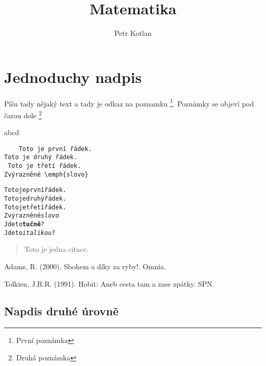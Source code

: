 \documentclass[a4paper, 12pt]{article}
\title{Matematika}
\author{Petr Kotlan}
\date{}
\begin{document}
\maketitle


\section{Jednoduchy nadpis}
Píšu tady nějaký text a tady je odkaz na poznamku \footnote[1]{První poznámka}.
Poznámky \footnotemark[1]{} se objeví pod čarou dole \footnote{Druhá poznámka}

\begin{multicols}{4}
    \tiny
    \lipsum[1-2]
\end{multicols}

{\scriptsize
\lipsum[1]}

\textgreek{abcd}

\begin{verbatim}
    Toto je první řádek.
Toto je druhý řádek.
 Toto je třetí řádek.
Zvýrazněné \emph{slovo}
\end{verbatim}

\begin{alltt}
    Toto je první řádek.
    Toto je druhý řádek.
     Toto je třetí řádek.
    Zvýrazněné \emph{slovo}
    Jde to \textbf{tučně}?
    Jde to \textit{italikou}?
\end{alltt}

\begin{quote}
    \lipsum[1-2]
\end{quote}

\begin{quotation}
    \lipsum[1-2] \cite[Str. 21-22]{Tolkien1991}
\end{quotation}

\begin{quote}
    Toto je jedna citace. \cite{Tolkien1991}
\end{quote}

\begin{thebibliography}{9}
    Adams, R. (2000). Sbohem a díky za ryby!. Omnia.

    Tolkien, J.R.R. (1991). Hobit: Aneb cesta tam a zase zpátky. SPN.

\end{thebibliography}

\lipsum

\subsection{Napdis druhé úrovně}
\lipsum[1-32]
\end{document}
